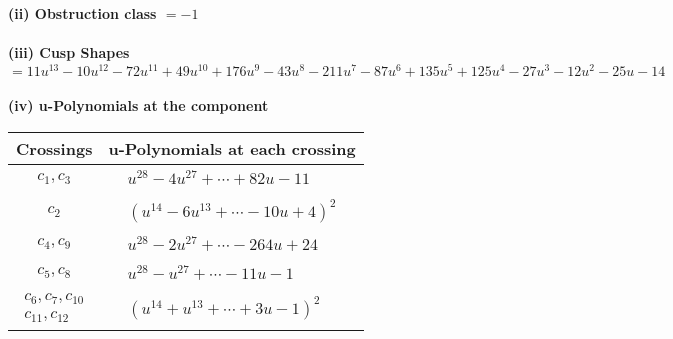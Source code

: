 \documentclass[1p]{elsarticle_modified}
\theoremstyle{definition}
\begin{document}
\flushleft \textbf{(ii) Obstruction class $= -1$}\\~\\
\flushleft \textbf{(iii) Cusp Shapes $= 11 u^{13}-10 u^{12}-72 u^{11}+49 u^{10}+176 u^9-43 u^8-211 u^7-87 u^6+135 u^5+125 u^4-27 u^3-12 u^2-25 u-14$}\\~\\
\newpage\renewcommand{\arraystretch}{1}
\flushleft \textbf{(iv) u-Polynomials at the component}\newline \\
\begin{tabular}{m{50pt}|m{274pt}}
Crossings & \hspace{64pt}u-Polynomials at each crossing \\
\hline $$\begin{aligned}c_{1},c_{3}\end{aligned}$$&$\begin{aligned}
&u^{28}-4 u^{27}+\cdots+82 u-11
\end{aligned}$\\
\hline $$\begin{aligned}c_{2}\end{aligned}$$&$\begin{aligned}
&(u^{14}-6 u^{13}+\cdots-10 u+4)^{2}
\end{aligned}$\\
\hline $$\begin{aligned}c_{4},c_{9}\end{aligned}$$&$\begin{aligned}
&u^{28}-2 u^{27}+\cdots-264 u+24
\end{aligned}$\\
\hline $$\begin{aligned}c_{5},c_{8}\end{aligned}$$&$\begin{aligned}
&u^{28}- u^{27}+\cdots-11 u-1
\end{aligned}$\\
\hline $$\begin{aligned}c_{6},c_{7},c_{10}\\c_{11},c_{12}\end{aligned}$$&$\begin{aligned}
&(u^{14}+u^{13}+\cdots+3 u-1)^{2}
\end{aligned}$\\
\hline
\end{tabular}\\~\\
\newpage\renewcommand{\arraystretch}{1}
\end{document}
